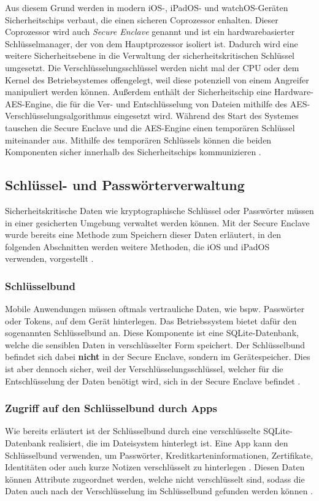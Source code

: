 Aus diesem Grund werden in modern iOS-, iPadOS- und watchOS-Geräten Sicherheitschips verbaut, die einen sicheren
Coprozessor enhalten. Dieser Coprozessor wird auch \textit{Secure Enclave} genannt und ist ein hardwarebasierter 
Schlüsselmanager, der von dem Hauptprozessor isoliert ist. Dadurch wird eine weitere Sicherheitsebene in die 
Verwaltung der sicherheitskritischen Schlüssel umgesetzt. Die Verschlüsselungsschlüssel werden nicht mal
der CPU oder dem Kernel des Betriebsystemes offengelegt, weil diese potenziell von einem Angreifer manipuliert
werden können. Außerdem enthält der Sicherheitschip eine Hardware-AES-Engine, die für die Ver- und Entschlüsselung
von Dateien mithilfe des AES-Verschlüsselungsalgorithmus eingesetzt wird. Während des Start des Systemes tauschen
die Secure Enclave und die AES-Engine einen temporären Schlüssel miteinander aus. Mithilfe des temporären Schlüssels
können die beiden Komponenten sicher innerhalb des Sicherheitschips
kommunizieren \cite{apple2020hardware_security,apple2020}.

\subsection{Schlüssel- und Passwörterverwaltung}
Sicherheitskritische Daten wie kryptographische Schlüssel oder Passwörter müssen in einer gesicherten Umgebung
verwaltet werden können. Mit der Secure Enclave wurde bereits eine Methode zum Speichern dieser Daten erläutert, 
in den folgenden Abschnitten werden weitere Methoden, die iOS und iPadOS
verwenden, vorgestellt \cite{apple2020}.

\subsubsection{Schlüsselbund}
Mobile Anwendungen müssen oftmals vertrauliche Daten, wie bspw. Pass\-wör\-ter oder Tokens, auf dem Gerät hinterlegen. 
Das Betriebssystem bietet dafür den sogenannten Schlüsselbund an. Diese Komponente ist eine SQLite-Datenbank,
welche die sensiblen Daten in verschlüsselter Form speichert. Der Schlüsselbund befindet sich dabei \textbf{nicht} in der
Secure Enclave, sondern im Gerätespeicher. Dies ist aber dennoch sicher, weil der Verschlüsselungsschlüssel, welcher
für die Entschlüsselung der Daten benötigt wird, sich in der Secure Enclave
befindet \cite{apple2020}.

\subsubsection{Zugriff auf den Schlüsselbund durch Apps}
Wie bereits erläutert ist der Schlüsselbund durch eine verschlüsselte
SQLite-Datenbank realisiert, die im Dateisystem hinterlegt ist. Eine App kann
den Schlüsselbund verwenden, um Passwörter, Kreditkarteninformationen,
Zertifikate, Identitäten oder auch kurze Notizen verschlüsselt zu hinterlegen
\cite{apple2020keychain_services}.  Diesen Daten können Attribute zugeordnet
werden, welche nicht verschlüsselt sind, sodass die Daten auch nach der
Verschlüsselung im Schlüsselbund gefunden werden können
\cite{apple2020keychain_items}. 

